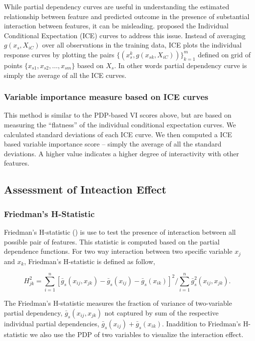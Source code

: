 \documentclass[11pt,a4paper,]{article}
\theoremstyle{definition}
\theoremstyle{definition}
\theoremstyle{definition}
\theoremstyle{remark}
\begin{document}
While partial dependency curves are useful in understanding the
estimated relationship between feature and predicted outcome in the
presence of substantial interaction between features, it can be
misleading. \textcite{goldstein2015peeking} proposed the Individual
Conditional Expectation (ICE) curves to address this issue. Instead of
averaging \(g(x_s, X_{iC})\) over all observations in the training data,
ICE plots the individual response curves by plotting the pairs
\(\{(x_s^k, g(x_{sk}, X_{iC}))\}_{k=1}^{m}\) defined on grid of points
\(\{x_{s1}, x_{s2},\dots, x_{sm}\}\) based on \(X_s\). In other words
partial dependency curve is simply the average of all the ICE curves.

\subsubsection{Variable importance measure based on ICE
curves}\label{variable-importance-measure-based-on-ice-curves}

This method is similar to the PDP-based VI scores above, but are based
on measuring the ``flatness'' of the individual conditional expectation
curves. We calculated standard deviations of each ICE curve. We then
computed a ICE based variable importance score -- simply the average of
all the standard deviations. A higher value indicates a higher degree of
interactivity with other features.

\subsection{Assessment of Inteaction
Effect}\label{assessment-of-inteaction-effect}

\subsubsection{Friedman's H-Statistic}\label{friedmans-h-statistic}

Friedman's H-statistic (\textcite{friedman2008predictive}) is use to
test the presence of interaction between all possible pair of features.
This statistic is computed based on the partial dependence functions.
For two way interaction between two specific variable \(x_j\) and
\(x_k\), Friedman's H-statistic is defined as follow,

\[H_{jk}^2=\sum_{i=1}^{n}[\bar{g}_{s}(x_{ij}, x_{jk})-\bar{g}_{s}(x_{ij})-\bar{g}_{s}(x_{ik})]^2/\sum_{i=1}^{n}\bar{g}^2_{s}(x_{ij}, x_{jk}).\]

The Friedman's H-statistic measures the fraction of variance of
two-variable partial dependency, \(\bar{g}_{s}(x_{ij}, x_{jk})\) not
captured by sum of the respective individual partial dependencies,
\(\bar{g}_{s}(x_{ij})+\bar{g}_{s}(x_{ik})\). Inaddition to Friedman's
H-statistic we also use the PDP of two variables to visualize the
interaction effect.
\end{document}
